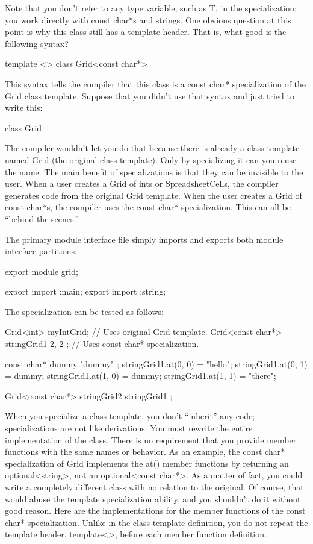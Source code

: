 Note that you don’t refer to any type variable, such as T, in the specialization: you work directly with const char*s and strings. One obvious question at this point is why this class still has a template header. That is, what good is the following syntax?

\begin{cpp}
template <>
class Grid<const char*>
\end{cpp}

This syntax tells the compiler that this class is a const char* specialization of the Grid class template. Suppose that you didn’t use that syntax and just tried to write this:

\begin{cpp}
class Grid
\end{cpp}

The compiler wouldn’t let you do that because there is already a class template named Grid (the original class template). Only by specializing it can you reuse the name. The main benefit of specializations is that they can be invisible to the user. When a user creates a Grid of ints or SpreadsheetCells, the compiler generates code from the original Grid template. When the user creates a Grid of const char*s, the compiler uses the const char* specialization. This can all be “behind the scenes.”

The primary module interface file simply imports and exports both module interface partitions:

\begin{cpp}
export module grid;

export import :main;
export import :string;
\end{cpp}

The specialization can be tested as follows:

\begin{cpp}
Grid<int> myIntGrid; // Uses original Grid template.
Grid<const char*> stringGrid1 { 2, 2 }; // Uses const char* specialization.

const char* dummy { "dummy" };
stringGrid1.at(0, 0) = "hello";
stringGrid1.at(0, 1) = dummy;
stringGrid1.at(1, 0) = dummy;
stringGrid1.at(1, 1) = "there";

Grid<const char*> stringGrid2 { stringGrid1 };
\end{cpp}

When you specialize a class template, you don’t “inherit” any code; specializations are not like derivations. You must rewrite the entire implementation of the class. There is no requirement that you provide member functions with the same names or behavior. As an example, the const char* specialization of Grid implements the at() member functions by returning an optional<string>, not an optional<const char*>. As a matter of fact, you could write a completely different class with no relation to the original. Of course, that would abuse the template specialization ability, and you shouldn’t do it without good reason. Here are the implementations for the member functions of the const char* specialization. Unlike in the class template definition, you do not repeat the template header, template<>, before each member function definition.


